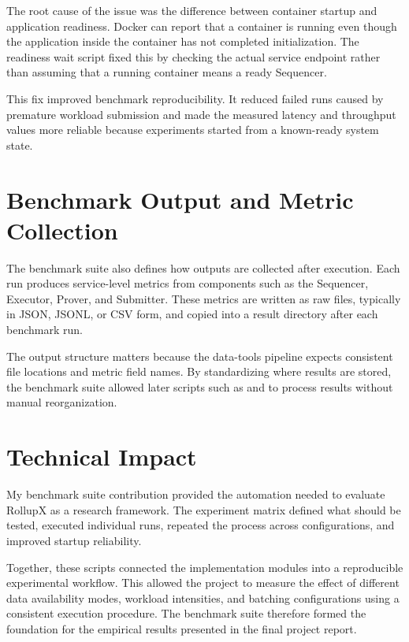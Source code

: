 The root cause of the issue was the difference between container startup and application readiness. Docker can report that a container is running even though the application inside the container has not completed initialization. The readiness wait script fixed this by checking the actual service endpoint rather than assuming that a running container means a ready Sequencer.

This fix improved benchmark reproducibility. It reduced failed runs caused by premature workload submission and made the measured latency and throughput values more reliable because experiments started from a known-ready system state.

\section{Benchmark Output and Metric Collection}

The benchmark suite also defines how outputs are collected after execution. Each run produces service-level metrics from components such as the Sequencer, Executor, Prover, and Submitter. These metrics are written as raw files, typically in JSON, JSONL, or CSV form, and copied into a result directory after each benchmark run.

The output structure matters because the data-tools pipeline expects consistent file locations and metric field names. By standardizing where results are stored, the benchmark suite allowed later scripts such as  and  to process results without manual reorganization.

\section{Technical Impact}

My benchmark suite contribution provided the automation needed to evaluate RollupX as a research framework. The experiment matrix defined what should be tested,  executed individual runs,  repeated the process across configurations, and  improved startup reliability.

Together, these scripts connected the implementation modules into a reproducible experimental workflow. This allowed the project to measure the effect of different data availability modes, workload intensities, and batching configurations using a consistent execution procedure. The benchmark suite therefore formed the foundation for the empirical results presented in the final project report.

